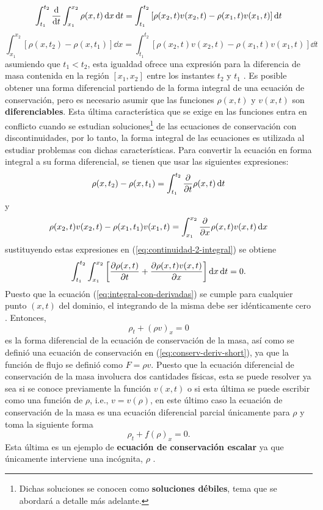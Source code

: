 \begin{equation}
	\int_{t_1}^{t_2}\dv{t}\int_{x_1}^{x_2}\rho(x,t)\dd{x}\dd{t}  = \int_{t_1}^{t_2}\left[\rho(x_2,t)v(x_2,t) - \rho(x_1,t)v(x_1,t)\right]\dd{t}
\end{equation}
\begin{equation}
	\int_{x_1}^{x_2}[\rho(x,t_2) - \rho(x,t_1)]\dd{x}  = \int_{t_1}^{t_2}\left[\rho(x_2,t)v(x_2,t) - \rho(x_1,t)v(x_1,t)\right]\dd{t} 
	\label{eq:continuidad-2-integral}
\end{equation}
asumiendo que $t_1<t_2$, esta igualdad ofrece una expresión para la diferencia de masa contenida en la región $[x_1,x_2]$ entre los instantes $t_2$ y $t_1$ \cite{Leveque}. 
Es posible obtener una forma diferencial partiendo de la forma integral de una ecuación de conservación, pero es necesario asumir que las funciones $\rho(x,t)$ y $v(x,t)$ son \textbf{diferenciables}. Esta última característica que se exige en las funciones entra en conflicto cuando se estudian soluciones\footnote{Dichas soluciones se conocen como \textbf{soluciones débiles}, tema que se abordará a detalle más adelante.} de las ecuaciones de conservación con discontinuidades, por lo tanto, la forma integral de las ecuaciones es utilizada al estudiar problemas con dichas características. Para convertir la ecuación en forma integral a su forma diferencial, se tienen que usar las siguientes expresiones:
\begin{equation}
	\rho(x,t_2)-\rho(x,t_1) = \int_{t_1}^{t_2}\pdv{t}\rho(x,t)\dd{t}
\end{equation}
y
\begin{equation}
	\rho(x_2,t)v(x_2,t)-\rho(x_1,t_1)v(x_1,t) = \int_{x_1}^{x_2}\pdv{x}\rho(x,t)v(x,t)\dd{x}
\end{equation}
sustituyendo estas expresiones en (\ref{eq:continuidad-2-integral}) se obtiene
\begin{equation}
	\int_{t_1}^{t_2}\int_{x_1}^{x_2}\left[\pdv{\rho(x,t)}{t} + \pdv{\rho(x,t)v(x,t)}{x}\right]\dd{x}\dd{t} = 0.
	\label{eq:integral-con-derivadas}
\end{equation}
Puesto que la ecuación (\ref{eq:integral-con-derivadas}) se cumple para cualquier punto $(x,t)$ del dominio, el integrando de la misma debe ser idénticamente cero \cite{Leveque}. Entonces,
\begin{equation}
	\rho_{t} + (\rho v)_{x} = 0
\end{equation}
es la forma diferencial de la ecuación de conservación de la masa, así como se definió una ecuación de conservación en (\ref{eq:conserv-deriv-short}), ya que la función de flujo se definió como $F = \rho v$. Puesto que la ecuación diferencial de conservación de la masa involucra dos cantidades físicas, esta se puede resolver ya sea si se conoce previamente la función $v(x,t)$ o si esta última se puede escribir como una función de $\rho$, i.e., $v=v(\rho)$, en este último caso la ecuación de conservación de la masa es una ecuación diferencial parcial únicamente para $\rho$ \cite{Leveque} y toma la siguiente forma
\begin{equation}
	\rho_t + f(\rho)_x = 0.
\end{equation}
Esta última es un ejemplo de \textbf{ecuación de conservación escalar} \cite{Leveque} ya que únicamente interviene una incógnita, $\rho$ \cite{Leveque}.
